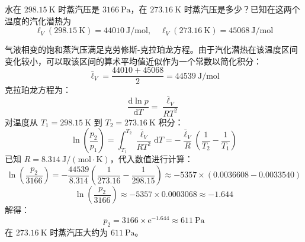 \begin{exercise}\label{ex:14.6}
水在 $298.15 \ \mathrm{K}$ 时蒸汽压是 $3166 \ \mathrm{Pa}$，在 $273.16 \ \mathrm{K}$ 时蒸汽压是多少？已知在这两个温度的汽化潜热为
$$ \ell_V(298.15 \ \mathrm{K}) = 44010 \ \mathrm{J/mol}, \quad \ell_V(273.16 \ \mathrm{K}) = 45068 \ \mathrm{J/mol} $$
\end{exercise}
\begin{solution}
气液相变的饱和蒸汽压满足克劳修斯-克拉珀龙方程。由于汽化潜热在该温度区间变化较小，可以取该区间的算术平均值近似作为一个常数以简化积分：
$$ \bar{\ell}_V = \frac{44010 + 45068}{2} = 44539 \ \mathrm{J/mol} $$
克拉珀龙方程为：
$$ \frac{\mathrm{d}\ln p}{\mathrm{d}T} = \frac{\bar{\ell}_V}{RT^2} $$
对温度从 $T_1 = 298.15 \ \mathrm{K}$ 到 $T_2 = 273.16 \ \mathrm{K}$ 积分：
$$ \ln \left( \frac{p_2}{p_1} \right) = \int_{T_1}^{T_2} \frac{\bar{\ell}_V}{RT^2} \mathrm{d}T = -\frac{\bar{\ell}_V}{R} \left( \frac{1}{T_2} - \frac{1}{T_1} \right) $$
已知 $R = 8.314 \ \mathrm{J/(mol \cdot K)}$，代入数值进行计算：
$$ \ln \left( \frac{p_2}{3166} \right) = -\frac{44539}{8.314} \left( \frac{1}{273.16} - \frac{1}{298.15} \right) \approx -5357 \times (0.0036608 - 0.0033540) $$
$$ \ln \left( \frac{p_2}{3166} \right) \approx -5357 \times 0.0003068 \approx -1.644 $$
解得：
$$ p_2 = 3166 \times \mathrm{e}^{-1.644} \approx 611 \ \mathrm{Pa} $$
在 $273.16 \ \mathrm{K}$ 时蒸汽压大约为 $611 \ \mathrm{Pa}$。
\end{solution}

